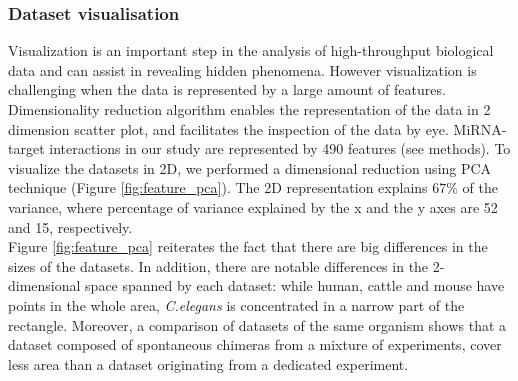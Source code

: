 \documentclass{bmcart}
\begin{document}

\subsubsection*{Dataset visualisation}
Visualization is an important step in the analysis of high-throughput biological data and can assist in revealing hidden phenomena. However visualization is challenging when the data is represented by a large amount of features. Dimensionality reduction algorithm enables the representation of the data in 2 dimension scatter plot, and facilitates the inspection of the data by eye. MiRNA-target interactions in our study are represented by 490 features (see methods). To visualize the datasets in 2D, we performed a dimensional reduction using PCA technique (Figure \ref{fig:feature_pca}). The 2D representation explains 67\% of the variance, where percentage of variance explained by the x and the y axes are 52 and 15, respectively. 
\\Figure \ref{fig:feature_pca} reiterates the fact that there are big differences in the sizes of the datasets. In addition, there are notable differences in the 2-dimensional space spanned by each dataset: while human, cattle and mouse have points in the whole area, \textit{C.elegans} is concentrated in a narrow part of the rectangle. Moreover, a comparison of datasets of the same organism shows that a dataset composed of spontaneous chimeras from a mixture of experiments, cover less area than a dataset originating from a dedicated experiment.
\end{document}

